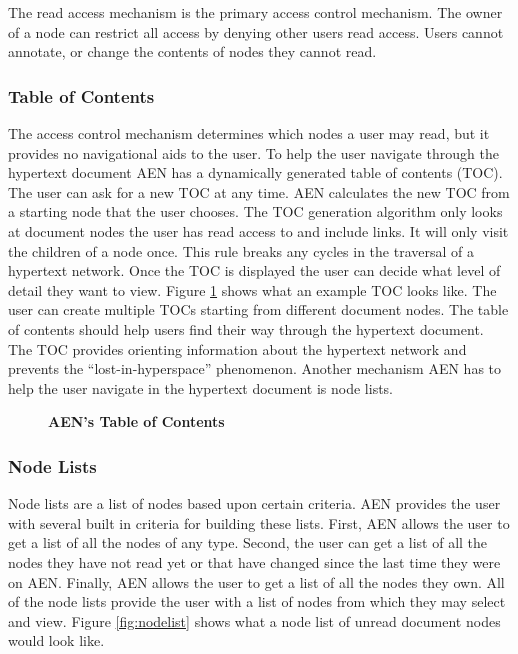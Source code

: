The read access mechanism is the primary access control mechanism.  The
owner of a node can restrict all access by denying other users read
access.  Users cannot annotate, or change the contents of nodes they cannot
read.


\subsubsection{Table of Contents}
The access control mechanism determines which nodes a user may read, but it
provides no navigational aids to the user.  To help the user navigate
through the hypertext document AEN has a dynamically generated table of
contents (TOC).  The user can ask for a new TOC at any time.  AEN
calculates the new TOC from a starting node that the user chooses.  The TOC
generation algorithm only looks at document nodes the user has read access
to and include links.  It will only visit the children of
a node once.  This rule breaks any cycles in the traversal of a hypertext
network.  Once the TOC is displayed the user can decide what level of
detail they want to view.  Figure \ref{fig:TOC} shows what an example TOC
looks like.  The user can create multiple TOCs starting from different
document nodes.  The table of contents should help users find their way
through the hypertext document.  The TOC provides orienting
information about the hypertext network and prevents the
``lost-in-hyperspace'' phenomenon.  Another mechanism AEN has to help the
user navigate in the hypertext document is node lists.


\begin{figure}[htb]
  \centerline{}
  \caption{{\bf AEN's Table of Contents}}
  \label{fig:TOC}
\end{figure}


\subsubsection{Node Lists}
Node lists are a list of nodes based upon certain
criteria.  AEN provides the user with several built in criteria for
building these lists.  First, AEN allows the user to get a list of all the
nodes of any type.  Second, the user can get a list of all the nodes they
have not read yet or that have changed since the last time they were on
AEN.  Finally, AEN allows the user to get a list of all the nodes they own.
All of the node lists provide the user with a list of nodes from which 
they may select and view. Figure \ref{fig:nodelist} shows what a node list
of unread document nodes would look like.


